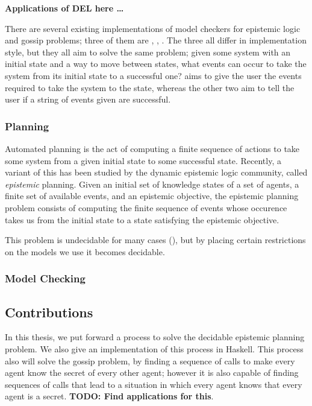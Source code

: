 \documentclass[12pt, a4paper]{article}
\begin{document}
\textbf{Applications of DEL here \ldots}

There are several existing implementations of model checkers for epistemic logic
and gossip problems; three of them are \cite{DEMO-S5}, \cite{GithubGossip},
\cite{SMCDEL}. The three all differ in implementation style, but they all aim to
solve the same problem; given some system with an initial state and a way to
move between states, what events can occur to take the system from its initial
state to a successful one? \cite{GithubGossip} aims to give the user the events
required to take the system to the state, whereas the other two aim to tell the
user if a string of events given are successful. 

\subsubsection{Planning}

Automated planning is the act of computing a finite sequence of actions to take
some system from a given initial state to some successful state. Recently, a
variant of this has been studied by the dynamic epistemic logic community,
called \textit{epistemic} planning. Given an initial set of knowledge states of
a set of agents, a finite set of available events, and an epistemic objective,
the epistemic planning problem consists of computing the finite sequence of
events whose occurence takes us from the initial state to a state satisfying the
epistemic objective.

This problem is undecidable for many cases (\cite{UndecidabilityEP}), but by placing
certain restrictions on the models we use it becomes decidable.

\subsubsection{Model Checking}

\subsection{Contributions}

In this thesis, we put forward a process to solve the decidable epistemic planning
problem. We also give an implementation of this process in Haskell. This process
also will solve the gossip problem, by finding a sequence of calls to make every
agent know the secret of every other agent; however it is also capable of
finding sequences of calls that lead to a situation in which every agent knows
that every agent is a secret. \textbf{TODO: Find applications for this}. 
\end{document}
